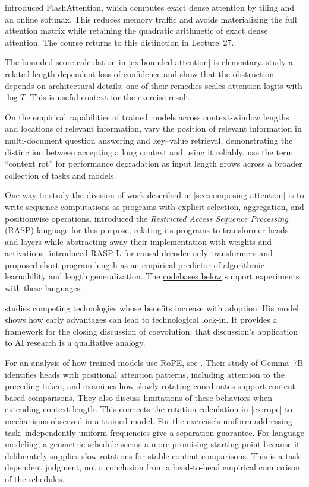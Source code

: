 \documentclass[11pt,twoside]{article}
\theoremstyle{plain}
\theoremstyle{definition}
\theoremstyle{remark}
\begin{document}
\citet{dao2022} introduced FlashAttention, which computes exact dense
attention by tiling and an online softmax. This reduces memory traffic and
avoids materializing the full attention matrix while retaining the quadratic
arithmetic of exact dense attention. The course returns to this
distinction in Lecture~27.

The bounded-score calculation in \cref{ex:bounded-attention} is elementary.
\citet{chiang2022} study a related length-dependent loss of confidence and show
that the obstruction depends on architectural details; one of their remedies
scales attention logits with $\log T$. This is useful context for the exercise
result.

On the empirical capabilities of trained models across context-window lengths
and locations of relevant information, \citet{liu2024} vary the position of
relevant information in multi-document question answering and key--value
retrieval, demonstrating the distinction between accepting a long context and
using it reliably.
\citet{hong2025} use the term ``context rot'' for performance degradation as
input length grows across a broader collection of tasks and models.

One way to study the division of work described in
\cref{sec:composing-attention} is to write sequence computations as programs
with explicit selection, aggregation, and positionwise operations.
\citet{weiss2021} introduced the \emph{Restricted Access Sequence Processing}
(RASP) language for this purpose, relating its programs to transformer heads
and layers while abstracting away their implementation with weights and
activations. \citet{zhou2024} introduced RASP-L for causal decoder-only
transformers and proposed short-program length as an empirical predictor of
algorithmic learnability and length generalization.
The \hyperref[app:experimental-codebases]{codebases below} support
experiments with these languages.

\citet{arthur1989} studies competing technologies whose benefits increase
with adoption. His model shows how early advantages can lead to technological
lock-in. It provides a framework for the closing discussion of coevolution;
that discussion's application to AI research is a qualitative analogy.

For an analysis of how trained models use RoPE, see \citet{barbero2025}.
Their study of Gemma~7B identifies heads with positional attention patterns,
including attention to the preceding token, and examines how slowly rotating
coordinates support content-based comparisons. They also discuss limitations
of these behaviors when extending context length. This connects the rotation
calculation in \cref{ex:rope} to mechanisms observed in a trained model.
For the exercise's uniform-addressing task, independently uniform frequencies
give a separation guarantee. For language modeling, a geometric schedule
seems a more promising starting point because it deliberately supplies slow
rotations for stable content comparisons. This is a task-dependent judgment,
not a conclusion from a head-to-head empirical comparison of the schedules.
\end{document}

